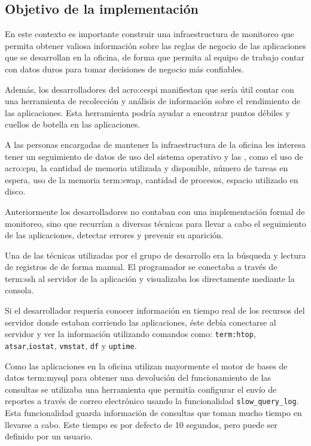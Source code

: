 \subsection{Objetivo de la implementación}
\label{objetivos_de_la_implementacion}

En este contexto es importante construir una infraestructura de monitoreo que
permita obtener valiosa información sobre las reglas de negocio de las
aplicaciones que se desarrollan en la oficina, de forma que permita al equipo
de trabajo contar con datos duros para tomar decisiones de negocio más
confiables.

Además, los desarrolladores del \gls{acro:cespi} manifiestan que sería útil
contar con una herramienta de recolección y análisis de información sobre el
rendimiento de las aplicaciones. Esta herramienta podría ayudar a encontrar
puntos débiles y cuellos de botella en las aplicaciones.

A las personas encargadas de mantener la infraestructura de la oficina les
interesa tener un seguimiento de datos de uso del sistema operativo y las
, como el uso de \gls{acro:cpu}, la cantidad de memoria utilizada
y disponible, número de tareas en espera, uso de la memoria \gls{term:swap},
cantidad de procesos, espacio utilizado en disco.

Anteriormente los desarrolladores no contaban con una implementación formal de
monitoreo, sino que recurrían a diversas técnicas para llevar a cabo el
seguimiento de las aplicaciones, detectar errores y prevenir su aparición.

Una de las técnicas utilizadas por el grupo de desarrollo era la búsqueda y
lectura de registros de  de forma manual. El programador se conectaba
a través de \gls{term:ssh} al servidor de la aplicación y visualizaba los
 directamente mediante la consola.

Si el desarrollador requería conocer información en tiempo real de los recursos
del servidor donde estaban corriendo las aplicaciones, éste debía conectarse al
servidor y ver la información utilizando comandos como:
\texttt{\gls{term:htop}}, \texttt{atsar},\texttt{iostat}, \texttt{vmstat},
\texttt{df} y \texttt{uptime}.

Como las aplicaciones en la oficina utilizan mayormente el motor de bases de
datos \gls{term:mysql} para obtener una devolución del funcionamiento de las consultas se
utilizaba una herramienta que permitía configurar el envío de reportes a través
de correo electrónico usando la funcionalidad \texttt{slow\_query\_log}. Esta
funcionalidad guarda información de consultas que toman mucho tiempo en
llevarse a cabo. Este tiempo es por defecto de 10 segundos, pero puede ser
definido por un usuario.

